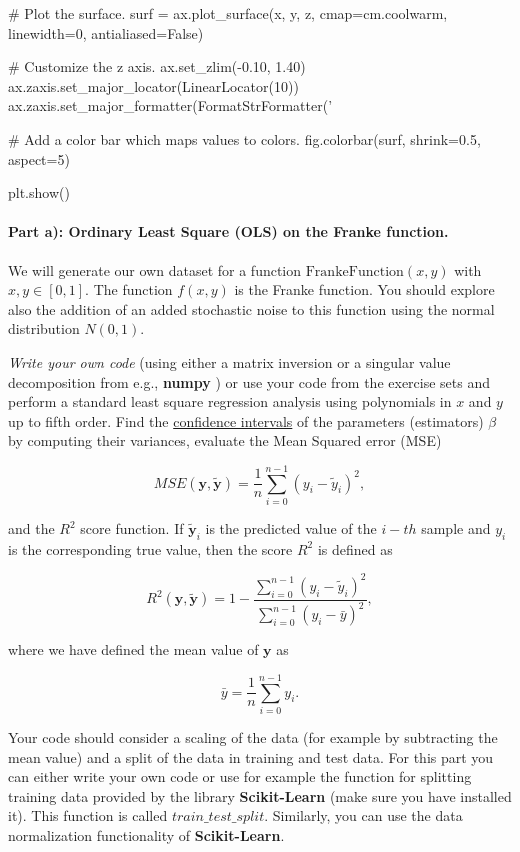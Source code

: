 \documentclass[%
oneside,                 %
final,                   %
10pt]{article}
\begin{document}
# Plot the surface.
surf = ax.plot_surface(x, y, z, cmap=cm.coolwarm,
                       linewidth=0, antialiased=False)

# Customize the z axis.
ax.set_zlim(-0.10, 1.40)
ax.zaxis.set_major_locator(LinearLocator(10))
ax.zaxis.set_major_formatter(FormatStrFormatter('%

# Add a color bar which maps values to colors.
fig.colorbar(surf, shrink=0.5, aspect=5)

plt.show()

\epycod


\paragraph{Part a): Ordinary Least Square (OLS) on the Franke function.}
We will generate our own dataset for a function
$\mathrm{FrankeFunction}(x,y)$ with $x,y \in [0,1]$. The function
$f(x,y)$ is the Franke function. You should explore also the addition
of an added stochastic noise to this function using the normal
distribution $N(0,1)$.

\emph{Write your own code} (using either a matrix inversion or a singular
value decomposition from e.g., \textbf{numpy} ) or use your code from
the exercise sets  and perform a standard least square regression
analysis using polynomials in $x$ and $y$ up to fifth order. Find the
\href{{https://en.wikipedia.org/wiki/Confidence_interval}}{confidence intervals} of the parameters (estimators) $\beta$ by computing their
variances, evaluate the Mean Squared error (MSE)

\[ MSE(\bm{y},\bm{\tilde{y}}) = \frac{1}{n}
\sum_{i=0}^{n-1}(y_i-\tilde{y}_i)^2, 
\] 

and the $R^2$ score function.  If $\tilde{\bm{y}}_i$ is the predicted
value of the $i-th$ sample and $y_i$ is the corresponding true value,
then the score $R^2$ is defined as

\[
R^2(\bm{y}, \tilde{\bm{y}}) = 1 - \frac{\sum_{i=0}^{n - 1} (y_i - \tilde{y}_i)^2}{\sum_{i=0}^{n - 1} (y_i - \bar{y})^2},
\]

where we have defined the mean value  of $\bm{y}$ as

\[
\bar{y} =  \frac{1}{n} \sum_{i=0}^{n - 1} y_i.
\]

Your code should consider  a scaling of the data (for example by
subtracting the mean value) and
a split of the data in training and test data. For this part you can
either write your own code or use for example the function for
splitting training data provided by the library \textbf{Scikit-Learn} (make
sure you have installed it).  This function is called
$train\_test\_split$. Similarly, you can use the data normalization functionality of
\textbf{Scikit-Learn}.
\end{document}
